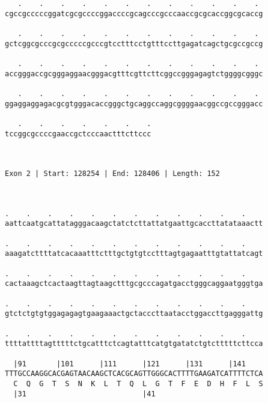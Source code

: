 \documentclass{article}
\begin{document}
\begin{Verbatim}
   .    .    .    .    .    .    .    .    .    .    .    . 
cgccgcccccggatcgcgccccggaccccgcagcccgcccaaccgcgcaccggcgcaccg
                                                            
   .    .    .    .    .    .    .    .    .    .    .    . 
gctcggcgcccgcgcccccgcccgtcctttcctgtttccttgagatcagctgcgccgccg
                                                            
   .    .    .    .    .    .    .    .    .    .    .    . 
accgggaccgcgggaggaacgggacgtttcgttcttcggccgggagagtctggggcgggc
                                                            
   .    .    .    .    .    .    .    .    .    .    .    . 
ggaggaggagacgcgtgggacaccgggctgcaggccaggcggggaacggccgccgggacc
                                                            
   .    .    .    .    .    .    .
tccggcgccccgaaccgctcccaactttcttccc
                                  
                                  
 
Exon 2 | Start: 128254 | End: 128406 | Length: 152



.    .    .    .    .    .    .    .    .    .    .    .    
aattcaatgcattatagggacaagctatctcttattatgaattgcaccttatataaactt
                                                            
.    .    .    .    .    .    .    .    .    .    .    .    
aaagatcttttatcacaaatttctttgctgtgtcctttagtgagaatttgtattatcagt
                                                            
.    .    .    .    .    .    .    .    .    .    .    .    
cactaaagctcactaagttagtaagctttgcgcccagatgacctgggcaggaatgggtga
                                                            
.    .    .    .    .    .    .    .    .    .    .    .    
gtctctgtgtggagagagtgaagaaactgctacccttaatacctggaccttgagggattg
                                                            
.    .    .    .    .    .    .    .    .    .    .    .    
ttttattttagtttttctgcatttctcagtatttcatgtgatatctgtctttttcttcca
                                                            
  |91       |101      |111      |121      |131      |141    
TTTGCCAAGGCACGAGTAACAAGCTCACGCAGTTGGGCACTTTTGAAGATCATTTTCTCA
  C  Q  G  T  S  N  K  L  T  Q  L  G  T  F  E  D  H  F  L  S
  |31                           |41                         
  

\end{Verbatim}
\end{document}
